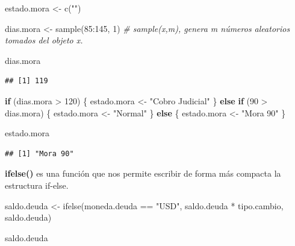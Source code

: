 \documentclass[
  12pt,
]{book}
\newenvironment{Shaded}{\begin{snugshade}}{\end{snugshade}}
\newcommand{\CommentTok}[1]{\textcolor[rgb]{0.56,0.35,0.01}{\textit{#1}}}
\newcommand{\ControlFlowTok}[1]{\textcolor[rgb]{0.13,0.29,0.53}{\textbf{#1}}}
\newcommand{\DecValTok}[1]{\textcolor[rgb]{0.00,0.00,0.81}{#1}}
\newcommand{\FunctionTok}[1]{\textcolor[rgb]{0.00,0.00,0.00}{#1}}
\newcommand{\NormalTok}[1]{#1}
\newcommand{\OtherTok}[1]{\textcolor[rgb]{0.56,0.35,0.01}{#1}}
\newcommand{\SpecialCharTok}[1]{\textcolor[rgb]{0.00,0.00,0.00}{#1}}
\newcommand{\StringTok}[1]{\textcolor[rgb]{0.31,0.60,0.02}{#1}}
\begin{document}
\begin{Shaded}
\begin{Highlighting}[]
\NormalTok{estado.mora }\OtherTok{\textless{}{-}} \FunctionTok{c}\NormalTok{(}\StringTok{""}\NormalTok{)}

\NormalTok{dias.mora }\OtherTok{\textless{}{-}} \FunctionTok{sample}\NormalTok{(}\DecValTok{85}\SpecialCharTok{:}\DecValTok{145}\NormalTok{, }\DecValTok{1}\NormalTok{) }\CommentTok{\# sample(x,m), genera m números aleatorios tomados del objeto x.}

\NormalTok{dias.mora}
\end{Highlighting}
\end{Shaded}

\begin{verbatim}
## [1] 119
\end{verbatim}

\begin{Shaded}
\begin{Highlighting}[]
\ControlFlowTok{if}\NormalTok{ (dias.mora }\SpecialCharTok{\textgreater{}} \DecValTok{120}\NormalTok{) \{}
\NormalTok{  estado.mora }\OtherTok{\textless{}{-}} \StringTok{"Cobro Judicial"}
\NormalTok{\} }\ControlFlowTok{else} \ControlFlowTok{if}\NormalTok{ (}\DecValTok{90} \SpecialCharTok{\textgreater{}}\NormalTok{ dias.mora) \{}
\NormalTok{  estado.mora }\OtherTok{\textless{}{-}} \StringTok{"Normal"}
\NormalTok{\} }\ControlFlowTok{else}\NormalTok{ \{}
\NormalTok{  estado.mora }\OtherTok{\textless{}{-}} \StringTok{"Mora 90"}
\NormalTok{\}}

\NormalTok{estado.mora}
\end{Highlighting}
\end{Shaded}

\begin{verbatim}
## [1] "Mora 90"
\end{verbatim}

\textbf{ifelse()} es una función que nos permite escribir de forma más compacta la estructura if-else.

\begin{Shaded}
\begin{Highlighting}[]
\NormalTok{saldo.deuda }\OtherTok{\textless{}{-}} \FunctionTok{ifelse}\NormalTok{(moneda.deuda }\SpecialCharTok{==} \StringTok{"USD"}\NormalTok{, saldo.deuda }\SpecialCharTok{*}\NormalTok{ tipo.cambio, saldo.deuda)}

\NormalTok{saldo.deuda}
\end{Highlighting}
\end{Shaded}
\end{document}
